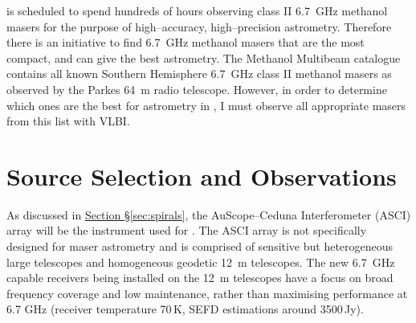 	
	\spirals\space is scheduled to spend hundreds of hours observing class II 6.7~GHz methanol masers for the purpose of high--accuracy, high--precision astrometry. Therefore there is an initiative to find 6.7~GHz methanol masers that are the most compact, and can give the best astrometry. The Methanol Multibeam catalogue \citep[MMB; ][]{Caswell2010,Green2010,Caswell2011,Green2012,Breen2015} contains all known Southern Hemisphere 6.7~GHz class II methanol masers as observed by the Parkes 64~m radio telescope. However, in order to determine which ones are the best for astrometry in \spirals, I must observe all appropriate masers from this list with VLBI.

\section{Source Selection and Observations}
    \label{sec:v534_observation}
    As discussed in \hyperref[sec:spirals]{Section \S\ref*{sec:spirals}}, the AuScope--Ceduna Interferometer (ASCI) array will be the instrument used for \spirals. The ASCI array is not specifically designed for maser astrometry and is comprised of sensitive but heterogeneous large telescopes and homogeneous geodetic 12~m telescopes. The new 6.7~GHz capable receivers being installed on the 12~m telescopes have a focus on broad frequency coverage and low maintenance, rather than maximising performance at 6.7 GHz (receiver temperature 70\,K, SEFD estimations around 3500\,Jy). %
    
